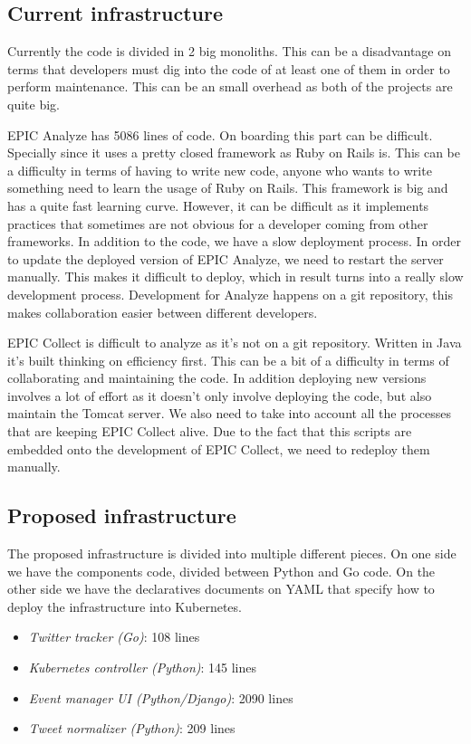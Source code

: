 \subsection{Current infrastructure}

Currently the code is divided in 2 big monoliths. This can be a disadvantage on terms that developers must dig into the code of at least one of them in order to perform maintenance. This can be an small overhead as both of the projects are quite big. 

EPIC Analyze has 5086 lines of code. On boarding this part can be difficult. Specially since it uses a pretty closed framework as Ruby on Rails is. This can be a difficulty in terms of having to write new code, anyone who wants to write something need to learn the usage of Ruby on Rails. This framework is big and has a quite fast learning curve. However, it can be difficult as it implements practices that sometimes are not obvious for a developer coming from other frameworks. In addition to the code, we have a slow deployment process. In order to update the deployed version of EPIC Analyze, we need to restart the server manually. This makes it difficult to deploy, which in result turns into a really slow development process. Development for Analyze happens on a git repository, this makes collaboration easier between different developers.

EPIC Collect is difficult to analyze as it’s not on a git repository. Written in Java it’s built thinking on efficiency first.  This can be a bit of a difficulty in terms of collaborating and maintaining the code. In addition deploying new versions involves a lot of effort as it doesn’t only involve deploying the code, but also maintain the Tomcat server. We also need to take into account all the processes that are keeping EPIC Collect alive. Due to the fact that this scripts are embedded onto the development of EPIC Collect, we need to redeploy them manually.

\subsection{Proposed infrastructure}

The proposed infrastructure is divided into multiple different pieces. On one side we have the components code, divided between Python and Go code. On the other side we have the declaratives documents on YAML that specify how to deploy the infrastructure into Kubernetes.

\begin{itemize}
	\item \textit{Twitter tracker (Go)}: 108 lines 
	\item \textit{Kubernetes controller (Python)}: 145 lines
	\item \textit{Event manager UI (Python/Django)}: 2090 lines
	\item \textit{Tweet normalizer (Python)}: 209 lines
\end{itemize}

